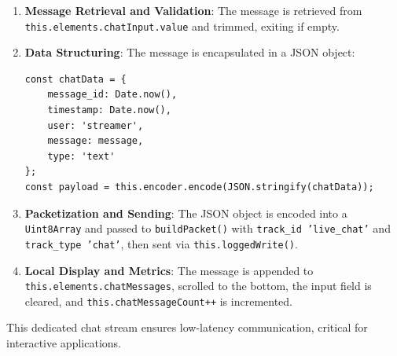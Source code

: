 \begin{enumerate}
    \item \textbf{Message Retrieval and Validation}: The message is retrieved from \texttt{this.elements.chatInput.value} and trimmed, exiting if empty.
    \item \textbf{Data Structuring}: The message is encapsulated in a JSON object:
    \begin{lstlisting}[breaklines=true,basicstyle=\small\ttfamily,frame=single]
const chatData = {
    message_id: Date.now(),
    timestamp: Date.now(),
    user: 'streamer',
    message: message,
    type: 'text'
};
const payload = this.encoder.encode(JSON.stringify(chatData));
    \end{lstlisting}
    \item \textbf{Packetization and Sending}: The JSON object is encoded into a \texttt{Uint8Array} and passed to \texttt{buildPacket()} with \texttt{track\_id 'live\_chat'} and \texttt{track\_type 'chat'}, then sent via \texttt{this.loggedWrite()}.
    \item \textbf{Local Display and Metrics}: The message is appended to \texttt{this.elements.chatMessages}, scrolled to the bottom, the input field is cleared, and \texttt{this.chatMessageCount++} is incremented.
\end{enumerate}

This dedicated chat stream ensures low-latency communication, critical for interactive applications.



